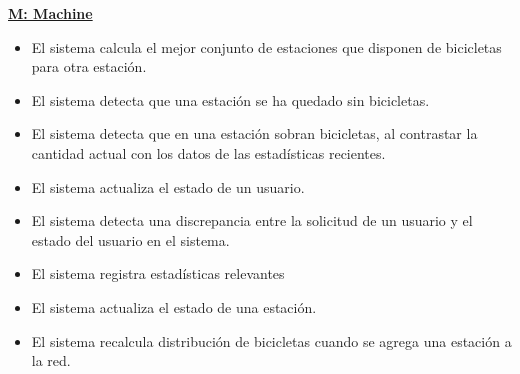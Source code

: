 \vspace{1cm}
\textbf{\underline{M: Machine}}

\begin{itemize}
\item El sistema calcula el mejor conjunto de estaciones que disponen de bicicletas para otra estación.
\item El sistema detecta que una estación se ha quedado sin bicicletas.
\item El sistema detecta que en una estación sobran bicicletas, al contrastar la cantidad actual con los datos
de las estadísticas recientes.
\item El sistema actualiza el estado de un usuario.
\item El sistema detecta una discrepancia entre la solicitud de un usuario y el estado del usuario en el sistema.
\item El sistema registra estadísticas relevantes
\item El sistema actualiza el estado de una estación.
\item El sistema recalcula distribución de bicicletas cuando se agrega una estación a la red.
\end{itemize}


